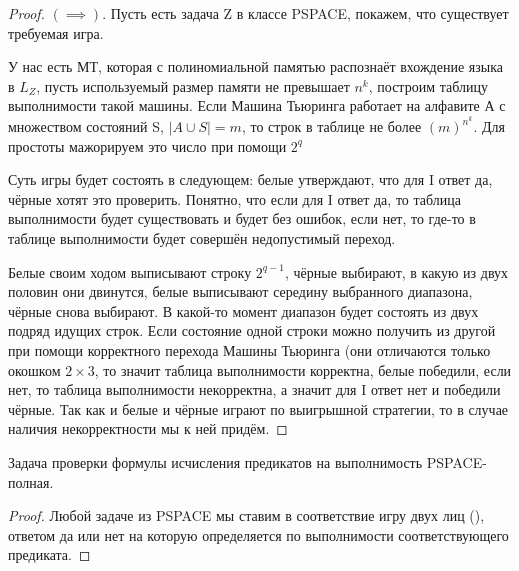 \begin{proof}
	$(\implies)$. Пусть есть задача Z в классе PSPACE, покажем, что
	существует требуемая игра.

	У нас есть МТ, которая с полиномиальной памятью распознаёт вхождение
	языка в $L_Z$, пусть используемый размер памяти  не превышает $n^k$, построим
	таблицу выполнимости такой машины. Если Машина Тьюринга работает на
	алфавите А с множеством состояний S,  $|A\cup S| = m$, то строк в
	таблице не более $(m)^{n^k}$. Для простоты мажорируем это число при
	помощи $ 2^q$

	Суть игры будет состоять в следующем: белые утверждают, что для I ответ
	да, чёрные хотят это проверить. Понятно, что если для I ответ да, то
	таблица выполнимости будет существовать и будет без ошибок, если нет, то
	где-то в таблице выполнимости будет совершён недопустимый переход. 

	Белые своим ходом выписывают строку $2^{q-1}$, чёрные выбирают, в какую из
	двух половин они двинутся, белые выписывают середину выбранного
	диапазона, чёрные снова выбирают. В какой-то момент диапазон будет
	состоять из двух подряд идущих строк. Если состояние одной строки можно
	получить из другой при помощи корректного перехода Машины Тьюринга (они
	отличаются только окошком $2 \times 3 $, то значит таблица выполнимости
	корректна, белые победили, если нет, то таблица выполнимости
	некорректна, а значит для I ответ нет и победили чёрные. Так как и белые
	и чёрные играют по выигрышной стратегии, то в случае наличия
	некорректности мы к ней придём. 
\end{proof}

 \begin{theorem}
	Задача проверки формулы исчисления предикатов на выполнимость
	PSPACE-полная.
\end{theorem}
 \begin{proof}
	 Любой задаче из PSPACE мы ставим в соответствие игру двух лиц
	 (), ответом да или нет на которую определяется по
	 выполнимости соответствующего предиката.
\end{proof}

